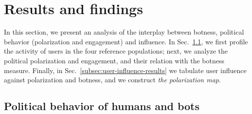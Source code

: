 
\section{Results and findings}
\label{sec:results-findings}

In this section, we present an analysis of the interplay between botness, political behavior (polarization and engagement) and influence.
In Sec.~\ref{subsec:polarization-botness}, we first profile the activity of users in the four reference populations; next, we analyze the political polarization and engagement, and their relation with the botness measure.
Finally, in Sec.~\ref{subsec:user-influence-results} we tabulate user influence against polarization and botness, and we construct \emph{the polarization map}.



\subsection{Political behavior of humans and bots}
\label{subsec:polarization-botness}

